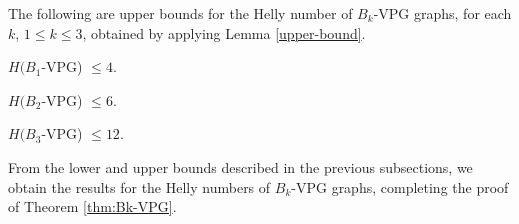 The following are upper bounds for the Helly number of $B_k$-VPG graphs, for each $k$, $1 \leq k \leq 3$, obtained  by applying Lemma \ref{upper-bound}.      
 
\begin{claim}\label{claim:upper-B1-VPG}
$H(B_1$-VPG) $\leq  4$.
\end{claim}


\begin{claim}\label{claim:upper-B2-VPG}
$H(B_2$-VPG)  $\leq  6$.
\end{claim}



\begin{claim}\label{claim:upper-B3-VPG}
$H(B_3$-VPG) $\leq  12$.
\end{claim}


From the lower and upper bounds described in the previous subsections, we obtain the results for the Helly numbers of $B_k$-VPG graphs, completing the proof of Theorem \ref{thm:Bk-VPG}.

